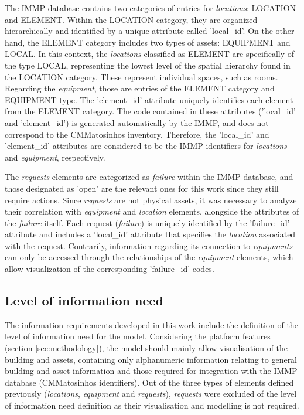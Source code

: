 \documentclass[a4paper, 10pt, twocolumn, twoside]{article}
\begin{document}
The IMMP database contains two categories of entries for \emph{locations}: LOCATION and ELEMENT. Within the LOCATION category, they are organized hierarchically and identified by a unique attribute called 'local\_id'. On the other hand, the ELEMENT category includes two types of assets: EQUIPMENT and LOCAL. In this context, the \emph{locations} classified as ELEMENT are specifically of the type LOCAL, representing the lowest level of the spatial hierarchy found in the LOCATION category. These represent individual spaces, such as rooms. Regarding the \emph{equipment}, those are entries of the ELEMENT category and EQUIPMENT type. The 'element\_id' attribute uniquely identifies each element from the ELEMENT category. The code contained in these attributes ('local\_id' and 'element\_id') is generated automatically by the IMMP, and does not correspond to the CMMatosinhos inventory. Therefore, the 'local\_id' and 'element\_id' attributes are considered to be the IMMP identifiers for \emph{locations} and \emph{equipment}, respectively.

The \emph{requests} elements are categorized as \emph{failure} within the IMMP database, and those designated as 'open' are the relevant ones for this work since they still require actions. Since \emph{requests} are not physical assets, it was necessary to analyze their correlation with \emph{equipment} and \emph{location} elements, alongside the attributes of the \emph{failure} itself. Each request (\emph{failure}) is uniquely identified by the 'failure\_id' attribute and includes a 'local\_id' attribute that specifies the \emph{location} associated with the request. Contrarily, information regarding its connection to \emph{equipments} can only be accessed through the relationships of the \emph{equipment} elements, which allow visualization of the corresponding 'failure\_id' codes.

\subsection{Level of information need}
\label{subsec:loin}

The information requirements developed in this work include the definition of the level of information need \cite{17412-1} for the model. Considering the platform features (section \ref{sec:methodology}), the model should mainly allow visualisation of the building and assets, containing only alphanumeric information relating to general building and asset information and those required for integration with the IMMP database (CMMatosinhos identifiers). Out of the three types of elements defined previously (\emph{locations}, \emph{equipment} and \emph{requests}), \emph{requests} were excluded of the level of information need definition as their visualisation and modelling is not required.
\end{document}
